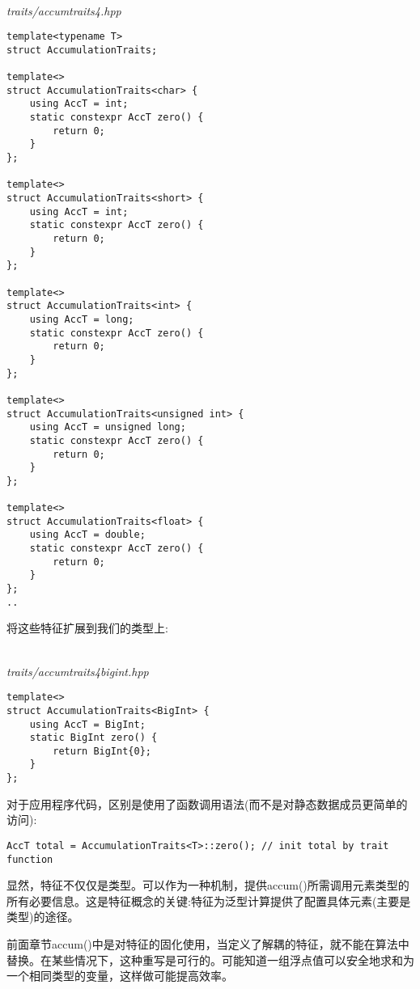 \hspace*{\fill} \\ %
\noindent
\textit{traits/accumtraits4.hpp}
\begin{lstlisting}[style=styleCXX]
template<typename T>
struct AccumulationTraits;

template<>
struct AccumulationTraits<char> {
	using AccT = int;
	static constexpr AccT zero() {
		return 0;
	}
};

template<>
struct AccumulationTraits<short> {
	using AccT = int;
	static constexpr AccT zero() {
		return 0;
	}
};

template<>
struct AccumulationTraits<int> {
	using AccT = long;
	static constexpr AccT zero() {
		return 0;
	}
};

template<>
struct AccumulationTraits<unsigned int> {
	using AccT = unsigned long;
	static constexpr AccT zero() {
		return 0;
	}
};

template<>
struct AccumulationTraits<float> {
	using AccT = double;
	static constexpr AccT zero() {
		return 0;
	}
};
..
\end{lstlisting}

将这些特征扩展到我们的类型上:

\hspace*{\fill} \\ %
\noindent
\textit{traits/accumtraits4bigint.hpp}
\begin{lstlisting}[style=styleCXX]
template<>
struct AccumulationTraits<BigInt> {
	using AccT = BigInt;
	static BigInt zero() {
		return BigInt{0};
	}
};
\end{lstlisting}

对于应用程序代码，区别是使用了函数调用语法(而不是对静态数据成员更简单的访问):

\begin{lstlisting}[style=styleCXX]
AccT total = AccumulationTraits<T>::zero(); // init total by trait function
\end{lstlisting}

显然，特征不仅仅是类型。可以作为一种机制，提供accum()所需调用元素类型的所有必要信息。这是特征概念的关键:特征为泛型计算提供了配置具体元素(主要是类型)的途径。


前面章节accum()中是对特征的固化使用，当定义了解耦的特征，就不能在算法中替换。在某些情况下，这种重写是可行的。可能知道一组浮点值可以安全地求和为一个相同类型的变量，这样做可能提高效率。


